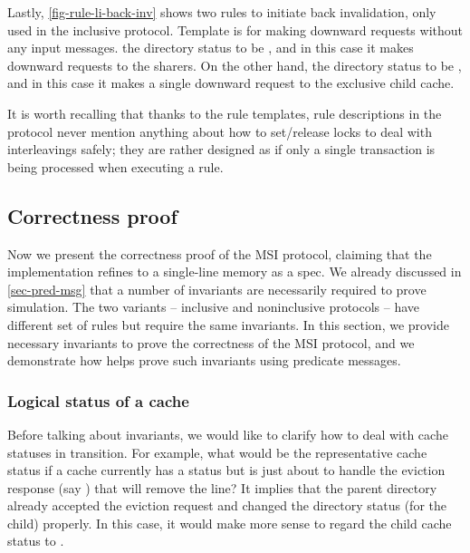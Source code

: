 Lastly, \autoref{fig-rule-li-back-inv} shows two rules to initiate back invalidation, only used in the inclusive protocol.
Template  is for making downward requests without any input messages.
  the directory status to be \stS{}, and in this case it makes downward requests to the sharers.
On the other hand,   the directory status to be \stM{}, and in this case it makes a single downward request to the exclusive child cache.

It is worth recalling that thanks to the rule templates, rule descriptions in the protocol never mention anything about how to set/release locks to deal with interleavings safely; they are rather designed as if only a single transaction is being processed when executing a rule.

\subsection{Correctness proof}
\label{sec-msi-proof}

Now we present the correctness proof of the MSI protocol, claiming that the implementation refines to a single-line memory as a spec.
We already discussed in \autoref{sec-pred-msg} that a number of invariants are necessarily required to prove simulation.
The two variants -- inclusive and noninclusive protocols -- have different set of rules but require the same invariants.
In this section, we provide necessary invariants to prove the correctness of the MSI protocol, and we demonstrate how \hemiola{} helps prove such invariants using predicate messages.

\subsubsection{Logical status of a cache}
Before talking about invariants, we would like to clarify how to deal with cache statuses in transition.
For example, what would be the representative cache status if a cache currently has a status \stS{} but is just about to handle the eviction response (say ) that will remove the line?
It implies that the parent directory already accepted the eviction request and changed the directory status (for the child) properly.
In this case, it would make more sense to regard the child cache status to \stI{}.

